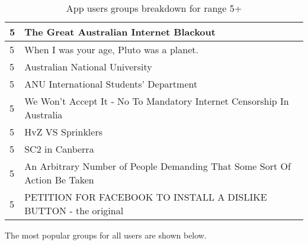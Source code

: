 \begin{table}[!htbp]
\begin{tabular}{|l|l|}
		5 & The Great Australian Internet Blackout \\ \hline
		5 & When I was your age, Pluto was a planet. \\ \hline
		5 & Australian National University \\ \hline
		5 & ANU International Students' Department \\ \hline
		5 & We Won't Accept It - No To Mandatory Internet Censorship In Australia \\ \hline
		5 & HvZ VS Sprinklers \\ \hline
		5 & SC2 in Canberra \\ \hline
		5 & An Arbitrary Number of People Demanding That Some Sort Of Action Be Taken \\ \hline
		5 & PETITION FOR FACEBOOK TO INSTALL A DISLIKE BUTTON - the original \\ \hline
	\end{tabular}
	\caption{App users groups breakdown for range 5+}
	\label{tab:revpol}
\end{table}
\clearpage

The most popular groups for all users are shown below.

